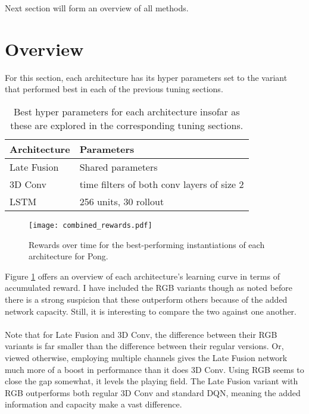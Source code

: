 Next section will form an overview of all methods.

\section{Overview}
\label{sec:overview}
For this section,
each architecture has its hyper parameters set
to the variant that performed best
in each of the previous tuning sections.

\begin{table}
  \center
  \begin{tabular}{ll}
    Architecture & Parameters \\
    \hline
    Late Fusion & Shared parameters \\
    3D Conv & time filters of both conv layers of size 2 \\
    LSTM & 256 units, 30 rollout \\
  \end{tabular}
  \caption[Best architecture hyper parameters]{
    Best hyper parameters for each architecture insofar as these are explored
    in the corresponding tuning sections.
  }
\end{table}

\begin{figure}[htpb]
  \centering
  \texttt{[image: combined\_rewards.pdf]}
  \caption[Architecture performance comparison]{
    Rewards over time
    for the best-performing instantiations
    of each architecture
    for Pong.
  }
  \label{fig:combined_rewards}
\end{figure}

Figure \ref{fig:combined_rewards}
offers an overview of each architecture's
learning curve in terms of accumulated reward.
I have included the RGB variants
though as noted before there is a strong suspicion
that these outperform others because of the added network capacity.
Still, it is interesting to compare the two against one another.

\paragraph{}
Note that for Late Fusion and 3D Conv,
the difference between their RGB variants
is far smaller than the difference
between their regular versions.
Or, viewed otherwise,
employing multiple channels
gives the Late Fusion network
much more of a boost in performance than it does 3D Conv.
Using RGB seems to close the gap somewhat,
it levels the playing field.
The Late Fusion variant with RGB
outperforms both regular 3D Conv and standard DQN,
meaning the added information and capacity
make a vast difference.

